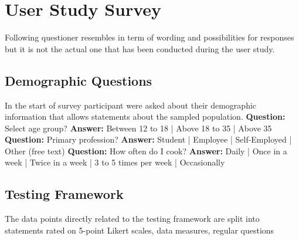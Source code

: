 \chapter{User Study Survey}

Following questioner resembles in term of wording and possibilities for responses but it is not the actual one that has been conducted during the user study.

\section{Demographic Questions}

In the start of survey participant were asked about their demographic information that allows statements about the sampled population.
\newline \newline
\textbf{Question:} Select age group?\newline
\textbf{Answer:} Between 12 to 18 | Above 18 to 35 | Above 35
\newline \newline
\textbf{Question:} Primary profession?\newline
\textbf{Answer:} Student | Employee | Self-Employed | Other  (free text)
\newline \newline
\textbf{Question:} How often do I cook?\newline
\textbf{Answer:} Daily | Once in a week | Twice in a week | 3 to 5 times per week | Occasionally

\section{Testing Framework}

The data points directly related to the testing framework are split into statements rated on 5-point Likert scales, data measures, regular questions \newline


